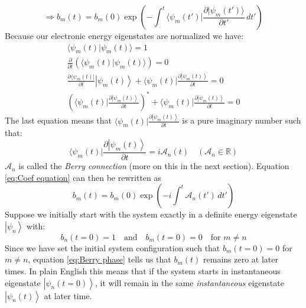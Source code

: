 \documentclass[11pt,a4paper]{article}
\begin{document}
\begin{equation}
	\label{eq:Coef equation}
	\Rightarrow b_m(t) = b_m(0) \exp\left( -\int^t \langle \psi_m(t') | \frac{\partial |\psi_m(t')\rangle}{\partial t'} \, dt' \right)
\end{equation}
Because our electronic energy eigenstates are normalized we have:
\begin{equation*}
	\begin{gathered}
		\langle \psi_m(t) | \psi_m(t) \rangle = 1 \\[6pt]
		\frac{\partial}{\partial t} \left( \langle \psi_m(t) | \psi_m(t) \rangle \right) = 0 \\[6pt]
		\frac{\partial \langle \psi_m(t) |}{\partial t} \left|\psi_m(t)\right\rangle + \langle \psi_m(t) | \frac{\partial \left|\psi_m(t)\right\rangle}{\partial t} = 0 \\[6pt]
		\left( \langle \psi_m(t) | \frac{\partial \left|\psi_m(t)\right\rangle}{\partial t} \right)^* + \langle \psi_m(t) | \frac{\partial \left|\psi_m(t)\right\rangle}{\partial t} = 0
	\end{gathered}
\end{equation*}
The last equation means that $\langle \psi_m(t) | \frac{\partial \left|\psi_m(t)\right\rangle}{\partial t}$ is a pure imaginary number such that:
\begin{equation*}
	\langle \psi_m(t) | \frac{\partial \left|\psi_m(t)\right\rangle}{\partial t} = i \boldsymbol{\mathcal{A}}_n(t) \quad (\boldsymbol{\mathcal{A}}_n \in \mathbb{R})
\end{equation*}
$\boldsymbol{\mathcal{A}}_n$ is called the \emph{Berry connection} (more on this in the next section). Equation \eqref{eq:Coef equation} can then be rewritten as
\begin{equation}
	\label{eq:Berry phase}
	b_m(t) = b_m(0) \exp\left( -i \int^t \boldsymbol{\mathcal{A}}_n(t') \, dt' \right)
\end{equation}
Suppose we initially start with the system exactly in a definite energy eigenstate $\left|\psi_n\right\rangle$ with:
\begin{equation*}
	b_n(t=0) = 1 \quad \text{and} \quad b_m(t=0) = 0 \quad \text{for } m \neq n
\end{equation*}
Since we have set the initial system configuration such that $b_m(t=0) = 0$ for $m \neq n$, equation \eqref{eq:Berry phase} tells us that $b_m(t)$ remains zero at later times. In plain English this means that if the system starts in instantaneous eigenstate $\left|\psi_n(t=0)\right\rangle$, it will remain in the same \emph{instantaneous} eigenstate $\left|\psi_n(t)\right\rangle$ at later time.
\end{document}

